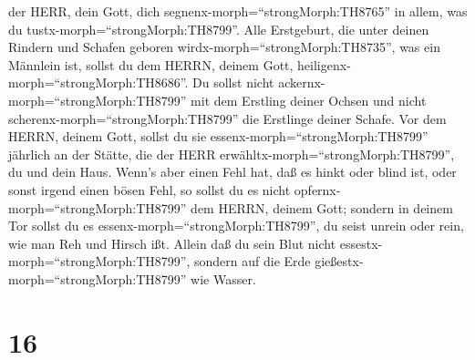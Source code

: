 der HERR, dein Gott, dich segnenx-morph=``strongMorph:TH8765'' in allem,
was du tustx-morph=``strongMorph:TH8799''.  Alle
Erstgeburt, die unter deinen Rindern und Schafen geboren
wirdx-morph=``strongMorph:TH8735'', was ein Männlein ist, sollst du dem
HERRN, deinem Gott, heiligenx-morph=``strongMorph:TH8686''. Du sollst
nicht ackernx-morph=``strongMorph:TH8799'' mit dem Erstling deiner
Ochsen und nicht scherenx-morph=``strongMorph:TH8799'' die Erstlinge
deiner Schafe.  Vor dem HERRN, deinem Gott, sollst du sie
essenx-morph=``strongMorph:TH8799'' jährlich an der Stätte, die der HERR
erwähltx-morph=``strongMorph:TH8799'', du und dein Haus. 
Wenn's aber einen Fehl hat, daß es hinkt oder blind ist, oder sonst
irgend einen bösen Fehl, so sollst du es nicht
opfernx-morph=``strongMorph:TH8799'' dem HERRN, deinem Gott;
 sondern in deinem Tor sollst du es
essenx-morph=``strongMorph:TH8799'', du seist unrein oder rein, wie man
Reh und Hirsch ißt.  Allein daß du sein Blut nicht
essestx-morph=``strongMorph:TH8799'', sondern auf die Erde
gießestx-morph=``strongMorph:TH8799'' wie Wasser.

\hypertarget{section-15}{%
\section{16}\label{section-15}}

